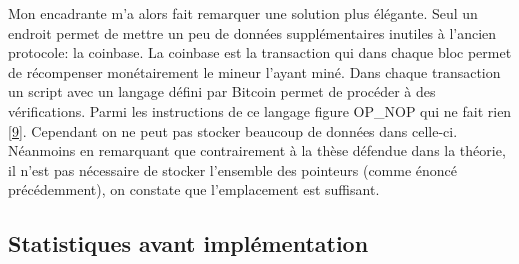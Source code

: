 \documentclass[12pt,a4paper]{article}
\newcommand{\source}[1]{\hyperlink{#1}{[#1]}}
\begin{document}
	Mon encadrante m'a alors fait remarquer une solution plus élégante. Seul un endroit permet de mettre un peu de données supplémentaires inutiles à l'ancien protocole: la coinbase. La coinbase est la transaction qui dans chaque bloc permet de récompenser monétairement le mineur l'ayant miné. Dans chaque transaction un script avec un langage défini par Bitcoin permet de procéder à des vérifications. Parmi les instructions de ce langage figure OP\_NOP qui ne fait rien \source{9}. Cependant on ne peut pas stocker beaucoup de données dans celle-ci. Néanmoins en remarquant que contrairement à la thèse défendue dans la théorie, il n'est pas nécessaire de stocker l'ensemble des pointeurs (comme énoncé précédemment), on constate que l'emplacement est suffisant.%
	
	\subsection{Statistiques avant implémentation}%
	
\end{document}
